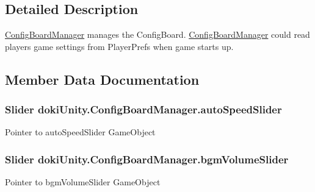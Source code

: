 \subsection{Detailed Description}
\hyperlink{classdoki_unity_1_1_config_board_manager}{Config\+Board\+Manager} manages the Config\+Board. \hyperlink{classdoki_unity_1_1_config_board_manager}{Config\+Board\+Manager} could read player\textquotesingle{}s game settings from Player\+Prefs when game starts up. 



\subsection{Member Data Documentation}
\subsubsection[{\texorpdfstring{auto\+Speed\+Slider}{autoSpeedSlider}}]{\setlength{\rightskip}{0pt plus 5cm}Slider doki\+Unity.\+Config\+Board\+Manager.\+auto\+Speed\+Slider}\hypertarget{classdoki_unity_1_1_config_board_manager_abda5b127dcedb869962f56947811bad4}{}\label{classdoki_unity_1_1_config_board_manager_abda5b127dcedb869962f56947811bad4}


Pointer to auto\+Speed\+Slider Game\+Object 

\subsubsection[{\texorpdfstring{bgm\+Volume\+Slider}{bgmVolumeSlider}}]{\setlength{\rightskip}{0pt plus 5cm}Slider doki\+Unity.\+Config\+Board\+Manager.\+bgm\+Volume\+Slider}\hypertarget{classdoki_unity_1_1_config_board_manager_ae773168ebe658d04aca52ad8015119b2}{}\label{classdoki_unity_1_1_config_board_manager_ae773168ebe658d04aca52ad8015119b2}


Pointer to bgm\+Volume\+Slider Game\+Object 

